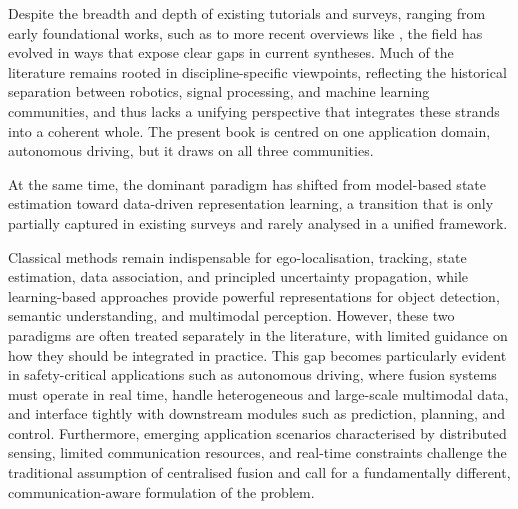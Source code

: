 Despite the breadth and depth of existing tutorials and surveys, ranging from early foundational works, such as \cite{luo_multisensor_1989, hall_introduction_1997, liggins_handbook_2009, khaleghi_multisensor_2013} to more recent overviews like \cite{baltrusaitis_multimodal_2019, 2023:IEEE_ITSM,TANG2023109165}, the field has evolved in ways that expose clear gaps in current syntheses. Much of the literature remains rooted in discipline-specific viewpoints, reflecting the historical separation between robotics, signal processing, and machine learning communities, and thus lacks a unifying perspective that integrates these strands into a coherent whole. The present book is centred on one application domain, autonomous driving, but it draws on all three communities.

At the same time, the dominant paradigm has shifted from model-based state estimation toward data-driven representation learning, a transition that is only partially captured in existing surveys and rarely analysed in a unified framework.

%
Classical methods remain indispensable for ego-localisation, tracking, state estimation, data association, and principled uncertainty propagation, while learning-based approaches provide powerful representations for object detection, semantic understanding, and multimodal perception. However, these two paradigms are often treated separately in the literature, with limited guidance on how they should be integrated in practice. This gap becomes particularly evident in safety-critical applications such as autonomous driving, where fusion systems must operate in real time, handle heterogeneous and large-scale multimodal data, and interface tightly with downstream modules such as prediction, planning, and control.
%
Furthermore, emerging application scenarios characterised by distributed sensing, limited communication resources, and real-time constraints challenge the traditional assumption of centralised fusion and call for a fundamentally different, communication-aware formulation of the problem.



